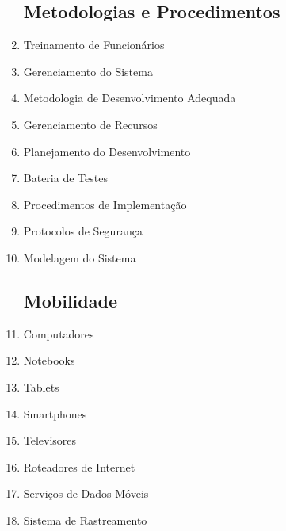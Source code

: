 \begin{enumerate}
	\subsection{Metodologias e Procedimentos}
	\item Treinamento de Funcionários
	\item Gerenciamento do Sistema
	\item Metodologia de Desenvolvimento Adequada
	\item Gerenciamento de Recursos
	\item Planejamento do Desenvolvimento
	\item Bateria de Testes
	\item Procedimentos de Implementação
	\item Protocolos de Segurança
	\item Modelagem do Sistema
	
	\subsection{Mobilidade}
	\item Computadores
	\item Notebooks
	\item Tablets
	\item Smartphones
	\item Televisores
	\item Roteadores de Internet
	\item Serviços de Dados Móveis
	\item Sistema de Rastreamento
\end{enumerate}

